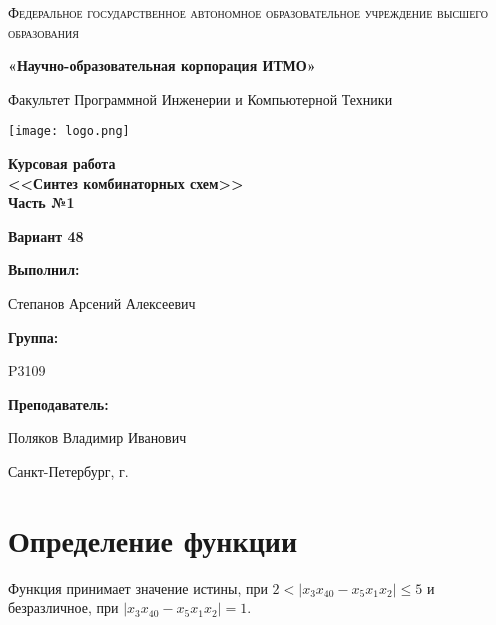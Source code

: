 \documentclass[12pt,a4paper]{report}
\begin{document}
\begin{titlepage}
	\centering
	{
        \scshape
        Федеральное государственное автономное образовательное учреждение высшего образования
        \par
        \textbf{«Научно-образовательная корпорация ИТМО»}
        \par
        \vspace*{1cm}
        Факультет Программной Инженерии и Компьютерной Техники
        \par
    }
    \vspace*{0.6cm}
    \texttt{[image: logo.png]}
    {
        \Large
        \textbf{Курсовая работа\\ <<Синтез комбинаторных схем>>\\ Часть №1}
        \par 
        \normalsize
        \vspace*{0.75cm}
        \textbf{Вариант 48}
        \par
    }
    \vfill
    \hfill\begin{minipage}{\dimexpr\textwidth-7.8cm}
        \textbf{Выполнил:}\par
        Степанов Арсений Алексеевич\par
        \vspace*{0.15cm}
        \textbf{Группа:}\par
        P3109\par
        \vspace*{0.15cm}
        \textbf{Преподаватель:}\par
        Поляков Владимир Иванович\par
    \end{minipage}
    \vfill
    Санкт-Петербург, \the\year{}г.
\end{titlepage}
\section*{Определение функции}
Функция принимает значение истины, при $2<|x_3x_40-x_5x_1x_2|\leq5$ и безразличное, при $|x_3x_40 - x_5x_1x_2|= 1$.
\end{document}

